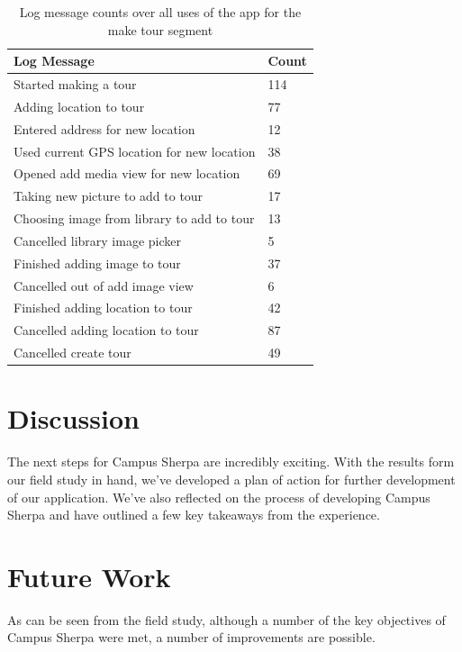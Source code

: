 \documentclass{sigchi}
\begin{document}
\begin{table}
\begin{tabular}{|l|l|}\hline
\textbf{Log Message} & \textbf{Count} \\ \hline
 Started making a tour & 114 \\ \hline
 Adding location to tour & 77 \\ \hline
 Entered address for new location & 12 \\ \hline
 Used current GPS location for new location & 38 \\ \hline
 Opened add media view for new location & 69 \\ \hline
 Taking new picture to add to tour & 17 \\ \hline
 Choosing image from library to add to tour & 13 \\ \hline
 Cancelled library image picker & 5 \\ \hline
 Finished adding image to tour & 37 \\ \hline
 Cancelled out of add image view & 6 \\ \hline
 Finished adding location to tour & 42 \\ \hline
 Cancelled adding location to tour & 87 \\ \hline
 Cancelled create tour & 49 \\ \hline
\end{tabular}
\caption{Log message counts over all uses of the app for the make tour segment}
\label{logging-results-make}
\end{table}

\section{Discussion}

The next steps for Campus Sherpa are incredibly exciting. With the results form our field study in hand, we've developed a plan of action for further development of our application. We've also reflected on the process of developing Campus Sherpa and have outlined a few key takeaways from the experience.

\section{Future Work}

As can be seen from the field study, although a number of the key objectives of Campus Sherpa were met, a number of improvements are possible. 
\end{document}

